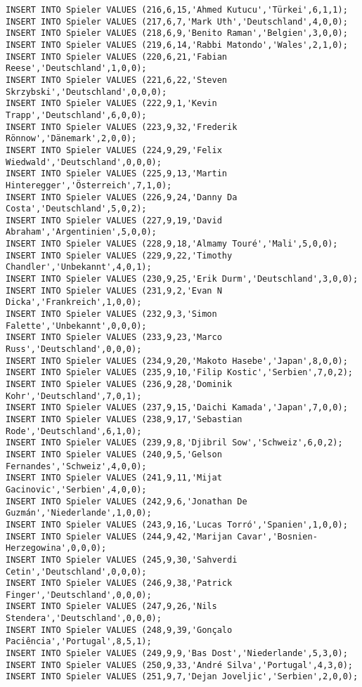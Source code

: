 \documentclass{lehramt-informatik-aufgabe}
\begin{document}
\begin{verbatim}
INSERT INTO Spieler VALUES (216,6,15,'Ahmed Kutucu','Türkei',6,1,1);
INSERT INTO Spieler VALUES (217,6,7,'Mark Uth','Deutschland',4,0,0);
INSERT INTO Spieler VALUES (218,6,9,'Benito Raman','Belgien',3,0,0);
INSERT INTO Spieler VALUES (219,6,14,'Rabbi Matondo','Wales',2,1,0);
INSERT INTO Spieler VALUES (220,6,21,'Fabian Reese','Deutschland',1,0,0);
INSERT INTO Spieler VALUES (221,6,22,'Steven Skrzybski','Deutschland',0,0,0);
INSERT INTO Spieler VALUES (222,9,1,'Kevin Trapp','Deutschland',6,0,0);
INSERT INTO Spieler VALUES (223,9,32,'Frederik Rönnow','Dänemark',2,0,0);
INSERT INTO Spieler VALUES (224,9,29,'Felix Wiedwald','Deutschland',0,0,0);
INSERT INTO Spieler VALUES (225,9,13,'Martin Hinteregger','Österreich',7,1,0);
INSERT INTO Spieler VALUES (226,9,24,'Danny Da Costa','Deutschland',5,0,2);
INSERT INTO Spieler VALUES (227,9,19,'David Abraham','Argentinien',5,0,0);
INSERT INTO Spieler VALUES (228,9,18,'Almamy Touré','Mali',5,0,0);
INSERT INTO Spieler VALUES (229,9,22,'Timothy Chandler','Unbekannt',4,0,1);
INSERT INTO Spieler VALUES (230,9,25,'Erik Durm','Deutschland',3,0,0);
INSERT INTO Spieler VALUES (231,9,2,'Evan N Dicka','Frankreich',1,0,0);
INSERT INTO Spieler VALUES (232,9,3,'Simon Falette','Unbekannt',0,0,0);
INSERT INTO Spieler VALUES (233,9,23,'Marco Russ','Deutschland',0,0,0);
INSERT INTO Spieler VALUES (234,9,20,'Makoto Hasebe','Japan',8,0,0);
INSERT INTO Spieler VALUES (235,9,10,'Filip Kostic','Serbien',7,0,2);
INSERT INTO Spieler VALUES (236,9,28,'Dominik Kohr','Deutschland',7,0,1);
INSERT INTO Spieler VALUES (237,9,15,'Daichi Kamada','Japan',7,0,0);
INSERT INTO Spieler VALUES (238,9,17,'Sebastian Rode','Deutschland',6,1,0);
INSERT INTO Spieler VALUES (239,9,8,'Djibril Sow','Schweiz',6,0,2);
INSERT INTO Spieler VALUES (240,9,5,'Gelson Fernandes','Schweiz',4,0,0);
INSERT INTO Spieler VALUES (241,9,11,'Mijat Gacinovic','Serbien',4,0,0);
INSERT INTO Spieler VALUES (242,9,6,'Jonathan De Guzmán','Niederlande',1,0,0);
INSERT INTO Spieler VALUES (243,9,16,'Lucas Torró','Spanien',1,0,0);
INSERT INTO Spieler VALUES (244,9,42,'Marijan Cavar','Bosnien-Herzegowina',0,0,0);
INSERT INTO Spieler VALUES (245,9,30,'Sahverdi Cetin','Deutschland',0,0,0);
INSERT INTO Spieler VALUES (246,9,38,'Patrick Finger','Deutschland',0,0,0);
INSERT INTO Spieler VALUES (247,9,26,'Nils Stendera','Deutschland',0,0,0);
INSERT INTO Spieler VALUES (248,9,39,'Gonçalo Paciência','Portugal',8,5,1);
INSERT INTO Spieler VALUES (249,9,9,'Bas Dost','Niederlande',5,3,0);
INSERT INTO Spieler VALUES (250,9,33,'André Silva','Portugal',4,3,0);
INSERT INTO Spieler VALUES (251,9,7,'Dejan Joveljic','Serbien',2,0,0);

\end{verbatim}
\end{document}
